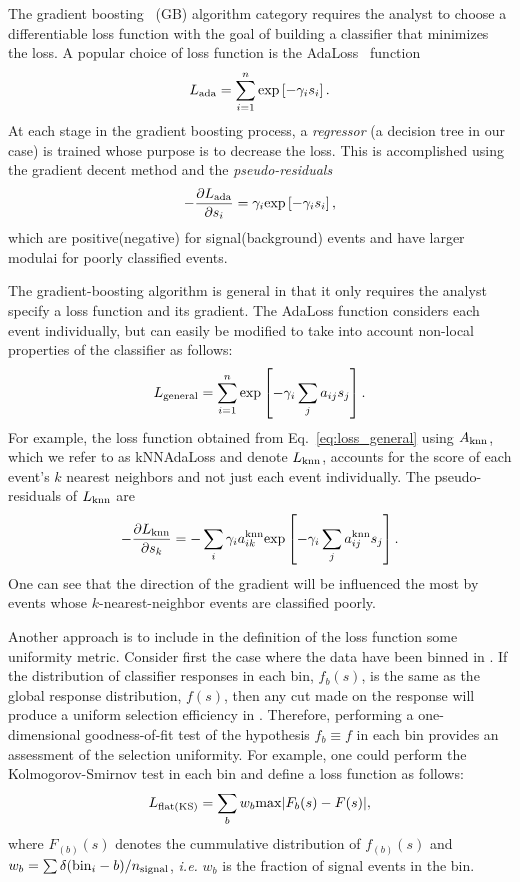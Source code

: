 The gradient boosting~\cite{ref:gradboost} (GB) algorithm category requires the analyst to choose a differentiable loss function with the goal of building a classifier that minimizes the loss.  
A popular choice of loss function is the AdaLoss~\cite{ref:adaboost} function 
\begin{equation}
L_{\rm ada} = \sum\limits_{i=1}^{n} {\rm exp}\left[-\gamma_i s_i\right]. 
\end{equation}
At each stage in the gradient boosting process, a {\em regressor} (a decision tree in our case) is trained whose purpose is to decrease the loss.  This is accomplished using the gradient decent method and the {\em pseudo-residuals}
\begin{equation}
  -\frac{\partial L_{\rm ada}}{\partial s_i} = \gamma_i  {\rm exp}\left[-\gamma_i s_i\right],
\end{equation}
which are positive(negative) for signal(background) events and have larger modulai for poorly classified events.  

The gradient-boosting algorithm is general in that it only requires the analyst specify a loss function and its gradient.  The AdaLoss function considers each event individually, but can easily be modified to take into account non-local properties of the classifier as follows:
\begin{equation}
  \label{eq:loss_general}
  L_{\rm general} = \sum\limits_{i=1}^{n} {\rm exp}\left[-\gamma_i \sum\limits_{j} a_{ij} s_j \right]. 
\end{equation} 
For example, the loss function obtained from Eq.~\ref{eq:loss_general} using $A_{\rm knn}$, which we refer to as kNNAdaLoss and denote $L_{\rm knn}$, accounts for the score of each event's $k$ nearest neighbors and not just each event individually.
The pseudo-residuals of $L_{\rm knn}$ are 
\begin{equation}
  -\frac{\partial L_{\rm knn}}{\partial s_k} = -\sum\limits_i \gamma_i a_{ik}^{\rm knn} {\rm exp}\left[-\gamma_i \sum_j a_{ij}^{\rm knn} s_j \right].
\end{equation}
One can see that the direction of the gradient will be influenced the most by events whose $k$-nearest-neighbor events are classified poorly. 

Another approach is to include in the definition of the loss function some uniformity metric.  Consider first the case where the data have been binned in \y.  If the distribution of classifier responses in each bin, $f_b(s)$, is the same as the global response distribution, $f(s)$, then any cut made on the response will produce a uniform selection efficiency in \y.  Therefore, performing a one-dimensional goodness-of-fit test of the hypothesis $f_b \equiv f$ in each bin provides an assessment of the selection uniformity.  
For example, one could perform the Kolmogorov-Smirnov test in each bin and define a loss function as follows:
\begin{equation}
  L_{\rm flat(KS)} = \sum\limits_{b} w_b {\rm max}|F_b(s)-F(s)|,
\end{equation}
where $F_{(b)}(s)$ denotes the cummulative distribution of $f_{(b)}(s)$ and $w_b = \sum \delta({\rm bin}_i - b)/n_{\rm signal}$, {\em i.e.} $w_b$ is the fraction of signal events in the bin.   


